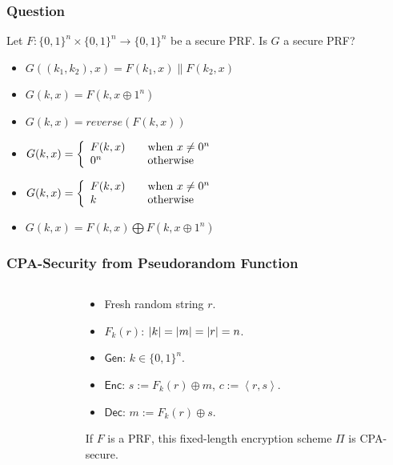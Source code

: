 \begin{frame}\frametitle{Question}
\begin{exampleblock}{Let $F: \{0,1\}^{n} \times \{0,1\}^{n} \to \{0,1\}^{n}$ be a secure PRF. Is $G$ a secure PRF?}
\begin{itemize}
\item $G((k_{1},k_{2}), x) = F(k_{1},x) \| F(k_{2},x)$
\item $G(k,x) = F(k, x\oplus 1^{n})$
\item $G(k,x) = reverse(F(k,x))$
\item $ G(k,x) = \left\{ 
  \begin{array}{l l}
    F(k,x) & \quad \text{when}\ x \neq 0^{n}\\
    0^{n} & \quad \text{otherwise}\\
  \end{array} \right. $
\item $ G(k,x) = \left\{ 
  \begin{array}{l l}
    F(k,x) & \quad \text{when}\ x \neq 0^{n}\\
    k & \quad \text{otherwise}\\
  \end{array} \right. $
\item $G(k,x) = F(k,x)\bigoplus F(k, x\oplus 1^{n})$
\end{itemize}
\end{exampleblock}
\end{frame}
\begin{frame}\frametitle{CPA-Security from Pseudorandom Function}
\begin{columns}[t]
\begin{column}{4cm}
\begin{figure}
\begin{center}

\end{center}
\end{figure}
\end{column}
\begin{column}{6cm}
\begin{construction}\label{thm:cpa}
\begin{itemize}
\item Fresh random string $r$.
\item $F_k(r)$: $\lvert k\rvert = \lvert m\rvert = \lvert r\rvert = n$.
\item $\mathsf{Gen}$: $k \in \{0,1\}^n$.
\item $\mathsf{Enc}$: $s := F_k(r)\oplus m$, $c := \left<r, s\right>$.
\item $\mathsf{Dec}$: $m := F_k(r)\oplus s$.
\end{itemize}
\end{construction}
\begin{theorem}\label{thm:prf}
If $F$ is a PRF, this fixed-length encryption scheme $\Pi$ is CPA-secure.
\end{theorem}
\end{column}
\end{columns}
\end{frame}
